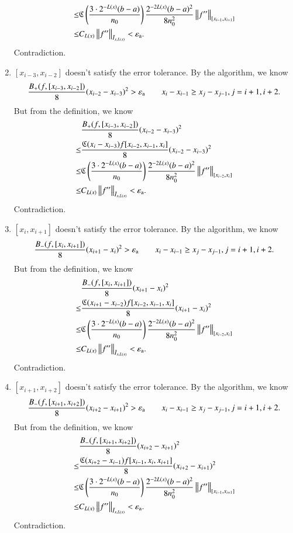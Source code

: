 \begin{enumerate}
\begin{align*}
    \le & \fC\left(\frac{3\cdot2^{-L(x)}(b-a)}{n_0}\right) \frac{2^{-2L(x)}(b-a)^2}{8n^2_0}\norm[{[x_{i-1},x_{i+1}]}]{f''} \\
     \le & C_{L(x)} \norm[\bar{I}_{x,L(x)}]{f''} < \abstol.
  \end{align*}
  Contradiction.
  \item $[x_{i-3},x_{i-2}]$ doesn't satisfy the error tolerance. By the algorithm, we know
  \[
  \frac{B_+(f,[x_{i-3},x_{i-2}])}{8}(x_{i-2}-x_{i-3})^2 > \abstol \qquad x_{i}-x_{i-1} \ge x_{j}-x_{j-1}, j=i+1,i+2.
  \]
  But from the definition, we know
  \begin{align*}
  & \frac{B_+(f,[x_{i-3},x_{i-2}])}{8}(x_{i-2}-x_{i-3})^2 \\  \le &\frac{\fC(x_i-x_{i-3})f[x_{i-2},x_{i-1},x_{i}]}{8}(x_{i-2}-x_{i-3})^2\\
    \le & \fC\left(\frac{3\cdot2^{-L(x)}(b-a)}{n_0}\right) \frac{2^{-2L(x)}(b-a)^2}{8n^2_0}\norm[{[x_{i-2},x_{i}]}]{f''} \\
     \le & C_{L(x)} \norm[\bar{I}_{x,L(x)}]{f''}< \abstol.
  \end{align*}
  Contradiction.
  \item $[x_{i},x_{i+1}]$ doesn't satisfy the error tolerance. By the algorithm, we know
  \[ \frac{B_-(f,[x_{i},x_{i+1}])}{8}(x_{i+1}-x_{i})^2 > \abstol \qquad x_{i}-x_{i-1} \ge x_{j}-x_{j-1}, j=i+1,i+2.
  \]
  But from the definition, we know
  \begin{align*}
  & \frac{B_-(f,[x_{i},x_{i+1}])}{8}(x_{i+1}-x_{i})^2 \\ \le &\frac{\fC(x_{i+1}-x_{i-2})f[x_{i-2},x_{i-1},x_{i}]}{8}(x_{i+1}-x_{i})^2\\
    \le & \fC\left(\frac{3\cdot2^{-L(x)}(b-a)}{n_0}\right) \frac{2^{-2L(x)}(b-a)^2}{8n^2_0}\norm[{[x_{i-2},x_{i}]}]{f''} \\
     \le & C_{L(x)} \norm[\bar{I}_{x,L(x)}]{f''}< \abstol.
  \end{align*}
  Contradiction.
  \item $[x_{i+1},x_{i+2}]$ doesn't satisfy the error tolerance. By the algorithm, we know
  \[
  \frac{B_-(f,[x_{i+1},x_{i+2}])}{8}(x_{i+2}-x_{i+1})^2 > \abstol \qquad x_{i}-x_{i-1} \ge x_{j}-x_{j-1}, j=i+1,i+2.
  \]
  But from the definition, we know
    \begin{align*}
  & \frac{B_-(f,[x_{i+1},x_{i+2}])}{8}(x_{i+2}-x_{i+1})^2 \\
  \le &\frac{\fC(x_{i+2}-x_{i-1})f[x_{i-1},x_{i},x_{i+1}]}{8}(x_{i+2}-x_{i+1})^2\\
  \le & \fC\left(\frac{3\cdot2^{-L(x)}(b-a)}{n_0}\right) \frac{2^{-2L(x)}(b-a)^2}{8n^2_0}\norm[{[x_{i-1},x_{i+1}]}]{f''} \\
     \le & C_{L(x)} \norm[\bar{I}_{x,L(x)}]{f''}<\abstol.
  \end{align*}
  Contradiction.
\end{enumerate}

